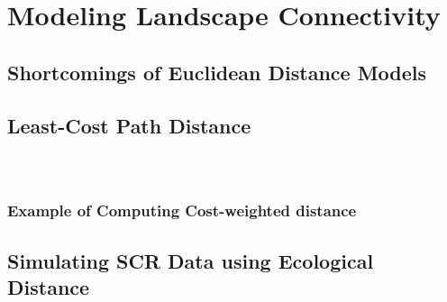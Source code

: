 \chapter{
Modeling Landscape Connectivity 
}
\label{chapt.ecoldist}


\section{Shortcomings of Euclidean Distance Models}


\begin{figure}[h]
\centering
\label{fig.distort}
\end{figure}


\section{Least-Cost Path Distance}

\begin{equation}
\label{eq.costweighted}
\end{equation}

\begin{equation}
\label{eq.lcp}
\end{equation}

\begin{equation}
\label{ecoldist.eq.cost}
\end{equation}


\subsection{Example of Computing Cost-weighted distance}


\begin{figure}[h]
\begin{center}
\end{center}
\label{ecoldist.fig.raster}
\end{figure}


\section{Simulating SCR Data using Ecological Distance}
\label{ecoldist.sec.simulating}


\begin{figure}[h]
\begin{tabular}{ll}
\end{tabular}
\label{ecoldist.fig.raster100}
\end{figure}


